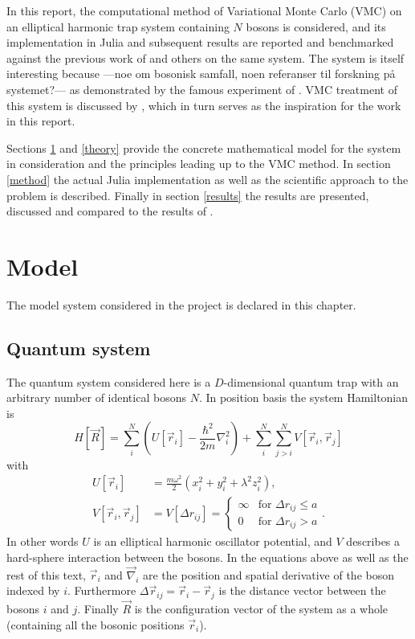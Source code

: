\documentclass[a4paper,8pt]{article}
\begin{document}
\begin{multicols}{2}
In this report, the computational method of Variational Monte Carlo (VMC) on an elliptical harmonic trap system containing $N$ bosons is considered, and its implementation in Julia and subsequent results are reported and benchmarked against the previous work of \cite{SWL} and others on the same system. The system is itself interesting because ---noe om bosonisk samfall, noen referanser til forskning på systemet?--- as demonstrated by the famous experiment of \cite{AEMWC}. VMC treatment of this system is discussed by \cite{DBG}, which in turn serves as the inspiration for the work in this report.

Sections \ref{model} and \ref{theory} provide the concrete mathematical model for the system in consideration and the principles leading up to the VMC method. In section \ref{method} the actual Julia implementation as well as the scientific approach to the problem is described. Finally in section \ref{results} the results are presented, discussed and compared to the results of \cite{SWL}.



\section{Model} \label{model}
The model system considered in the project is declared in this chapter.

\subsection{Quantum system}\label{system}
The quantum system considered here is a $D$-dimensional quantum trap with an arbitrary number of identical bosons $N$. In position basis the system Hamiltonian is
\begin{equation}\label{dimHam}
H[\vec{R}] = \sum\limits_i^N \left(U[\vec{r}_i] -\frac{\hbar^2}{2m}\nabla_i^2 \right) + \sum\limits_i^N\sum\limits_{j > i}^N V[\vec{r}_i,\vec{r}_j]
\end{equation}
with
\begin{align}
U[\vec{r}_i] &= \frac{m\omega^2}{2}\left(x_i^2+y_i^2+\lambda^2z_i^2\right), \\
V[\vec{r}_i,\vec{r}_j] &= V[\Delta{r}_{ij}] =\begin{cases} \infty & \text{for $\Delta{r}_{ij} \leq a$} \\
0 & \text{for $\Delta{r}_{ij} > a$} \end{cases}.
\end{align}
In other words $U$ is an elliptical harmonic oscillator potential, and $V$ describes a hard-sphere interaction between the bosons. In the equations above as well as the rest of this text, $\vec{r}_i$ and $\vec{\nabla}_i$ are the position and spatial derivative of the boson indexed by $i$. Furthermore $\Delta\vec{r}_{ij} = \vec{r}_i-\vec{r}_j$ is the distance vector between the bosons $i$ and $j$. Finally $\vec{R}$ is the configuration vector of the system as a whole (containing all the bosonic positions $\vec{r}_i$).


\end{multicols}
\end{document}
